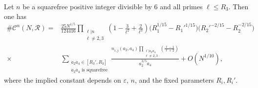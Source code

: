 \documentclass[10pt,a4paper]{amsart}
\begin{document}
\begin{lemma}\label{lem:Rn-asymp}
Let $n$ be a squarefree positive integer divisible by $6$ and all primes $\ell\leq R_3$. Then one has
\[
\begin{split}\#\mathcal{C}^n(N,\mathscr{R})
=&
\frac{25 N^{1/5}}{124416}\prod_{\substack{\ell|n\\\ell\neq 2,3}}\left(1-\frac{3}{\ell^2}+\frac{2}{\ell^3}\right)
\bigl(R_1^{1/15}-R_1'^{1/15}\bigr)
\bigl(R_2'^{-2/15}-R_2^{-2/15}\bigr) \\
\times &\sum_{\substack{a_2a_4\in [R_3', R_3]\\
    a_2a_4\text{ is squarefree}}}\frac{n_{i,j}(a_2,a_4)\prod_{\substack{\ell|a_2a_4\\ \ell\neq 2,3}}\left(\frac{\ell-1}{\ell+2}\right)}{a_2^{3/5} a_4}+
O\!\left(N^{1/10}\right),
\end{split}\]
where the implied constant depends on $\varepsilon$, $n$, and the fixed
parameters $R_i,R_i'$.
\end{lemma}
\end{document}
